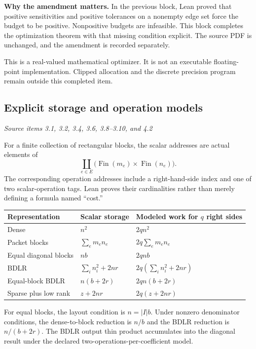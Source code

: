 \textbf{Why the amendment matters.} In the previous block, Lean proved that positive sensitivities and positive tolerances on a nonempty edge set force the budget to be positive. Nonpositive budgets are infeasible. This block completes the optimization theorem with that missing condition explicit. The source PDF is unchanged, and the amendment is recorded separately.

This is a real-valued mathematical optimizer. It is not an executable floating-point implementation. Clipped allocation and the discrete precision program remain outside this completed item.



\subsection{Explicit storage and operation models}\label{supp2:subsection:005}\textit{Source items 3.1, 3.2, 3.4, 3.6, 3.8--3.10, and 4.2}\par
For a finite collection of rectangular blocks, the scalar addresses are actual elements of
\[
\coprod_{e\in E}\bigl(\operatorname{Fin}(m_e)\times\operatorname{Fin}(n_e)\bigr).
\]
The corresponding operation addresses include a right-hand-side index and one of two scalar-operation tags. Lean proves their cardinalities rather than merely defining a formula named ``cost.''

\begin{center}\small
\renewcommand{\arraystretch}{1.3}
\begin{tabular}{@{}lll@{}}
\toprule
Representation & Scalar storage & Modeled work for $q$ right sides\\
\midrule
Dense & $n^2$ & $2qn^2$\\
Packet blocks & $\sum_em_en_e$ & $2q\sum_em_en_e$\\
Equal diagonal blocks & $nb$ & $2qnb$\\
BDLR & $\sum_i n_i^2+2nr$ & $2q(\sum_i n_i^2+2nr)$\\
Equal-block BDLR & $n(b+2r)$ & $2qn(b+2r)$\\
Sparse plus low rank & $z+2nr$ & $2q(z+2nr)$\\
\bottomrule
\end{tabular}
\end{center}
For equal blocks, the layout condition is $n=|I|b$. Under nonzero denominator conditions, the dense-to-block reduction is $n/b$ and the BDLR reduction is $n/(b+2r)$. The BDLR output thin product accumulates into the diagonal result under the declared two-operations-per-coefficient model.

